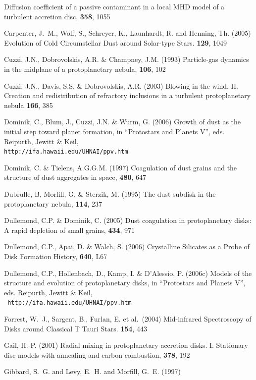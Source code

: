 \begin{literature}
  Diffusion coefficient of a passive contaminant in a local 
  MHD model of a turbulent accretion disc,
  \mnras \textbf{358}, 1055
\item Carpenter, J.~M., Wolf, S., Schreyer, K., Launhardt, R. and Henning,
  Th. (2005) 
  Evolution of Cold Circumstellar Dust around Solar-type Stars. 
  \aj \textbf{129}, 1049
\item Cuzzi, J.N., Dobrovolskis, A.R. \& Champney, J.M. (1993)
  Particle-gas dynamics in the midplane of a protoplanetary nebula,
  \ica \textbf{106}, 102
\item Cuzzi, J.N., Davis, S.S. \& Dobrovolskis, A.R. (2003) \ica
  Blowing in the wind. II. Creation and redistribution of refractory 
  inclusions in a turbulent protoplanetary nebula
  \textbf{166}, 385
\item Dominik, C., Blum, J., Cuzzi, J.N. \& Wurm, G. (2006) 
  Growth of dust as the initial step toward planet formation,
  in ``Protostars and Planets V'', eds. Reipurth, Jewitt \& Keil,\\ 
  {\tt http://ifa.hawaii.edu/UHNAI/ppv.htm}
\item Dominik, C. \& Tielens, A.G.G.M. (1997) 
  Coagulation of dust grains and the structure of dust aggregates in space,
  \apj \textbf{480}, 647
\item Dubrulle, B, Morfill, G. \& Sterzik, M. (1995) 
  The dust subdisk in the protoplanetary nebula,
  \ica \textbf{114}, 237
\item Dullemond, C.P. \& Dominik, C. (2005)
  Dust coagulation in protoplanetary disks: A rapid depletion of small grains,
  \aap \textbf{434}, 971
\item Dullemond, C.P., Apai, D. \& Walch, S. (2006)
  Crystalline Silicates as a Probe of Disk Formation History, 
  \apj \textbf{640}, L67
\item Dullemond, C.P., Hollenbach, D., Kamp, I. \& D'Alessio, P. (2006c)
  Models of the structure and evolution of protoplanetary disks, 
  in ``Protostars and Planets V'', eds. Reipurth, Jewitt \& Keil,\\ {\tt
  http://ifa.hawaii.edu/UHNAI/ppv.htm}
\item Forrest, W.~J., Sargent, B., Furlan, E. et al.~(2004) 
  Mid-infrared Spectroscopy of Disks around Classical T Tauri Stars.
  \apjs \textbf{154}, 443
\item Gail, H.-P. (2001) 
  Radial mixing in protoplanetary accretion disks. I. Stationary disc 
  models with annealing and carbon combustion,
  \aap \textbf{378}, 192
\item Gibbard, S.~G. and {Levy}, E.~H. and {Morfill}, G.~E. (1997)

\end{literature}

